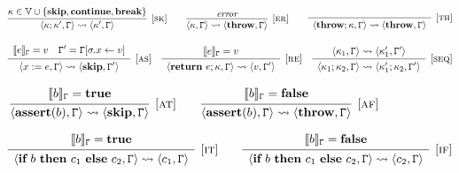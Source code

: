 \begin{figure}[t]
\centering
$$
\infer[{[\rname{sk}]}]{\conf{\kappa;\kappa',\cstate} \leadsto \conf{\kappa',\cstate}}{\kappa \in \mathbb{V} \cup \{\textbf{skip},\textbf{continue},\textbf{break}\}}
~~~~~~
\infer[{[\rname{er}]}]{\conf{\kappa,\cstate} \leadsto \conf{\textbf{throw},\cstate}}{\textit{error}}
~~~~~~
\infer[{[\rname{th}]}]{
	\begin{array}{c}
	\conf{\textbf{throw};\kappa,\cstate}
	\leadsto \conf{\textbf{throw},\cstate}
	\end{array}
	}{}
$$

$$
\infer[{[\rname{as}]}]
{
	\begin{array}{l}
	\conf{x:=e,\cstate} 
	\leadsto \conf{\textbf{skip},\cstate'}
	\end{array}
}{
	\begin{array}{c}
	\eval{e}_{\cstate} = v
	~~~
	\cstate' = \cstate[\lstate.x \leftarrow v]
	\end{array}}
~~~
\infer[{[\rname{re}]}]{
	\begin{array}{c}
		\conf{\textbf{return}~e;\kappa, \cstate}
		\leadsto \conf{v,\cstate'}
	\end{array}
}{\eval{e}_\cstate  = v}
~~~
\infer[{[\rname{seq}]}]{
	\begin{array}{c}
		\conf{\kappa_1;\kappa_2,\cstate}
		\leadsto \conf{\kappa'_1;\kappa_2,\cstate'}
	\end{array}
}{\conf{\kappa_1,\cstate} \leadsto \conf{\kappa'_1,\cstate'}}	
$$

$$
\infer[{[\rname{at}]}]{\conf{\textbf{assert}(b),\cstate} \leadsto \conf{\textbf{skip},\cstate}}{
	\begin{array}{c}
	\eval{b}_{\cstate} = \textbf{true}
	\end{array}
}
~~~~~~
\infer[{[\rname{af}]}]{\conf{\textbf{assert}(b),\cstate} \leadsto \conf{\textbf{throw},\cstate}}{
	\begin{array}{c}
	\eval{b}_{\cstate} = \textbf{false}
	\end{array}}
$$

$$
\infer[{[\rname{it}]}]{
	\begin{array}{c}
	\conf{\ifs{b}{c_1}{c_2},\cstate}
	\leadsto \conf{c_1,\cstate}
	\end{array}
}
{
	\begin{array}{c}
	\eval{b}_{\cstate} = \textbf{true}
	\end{array}
}	
~~~~~~
\infer[{[\rname{if}]}]{
	\begin{array}{c}
	\conf{\ifs{b}{c_1}{c_2},\cstate}
	\leadsto \conf{c_2,\cstate}
	\end{array}
}
{
	\begin{array}{c}
	\eval{b}_{\cstate} = \textbf{false}\\
	\end{array}
}	
$$


\end{figure}
